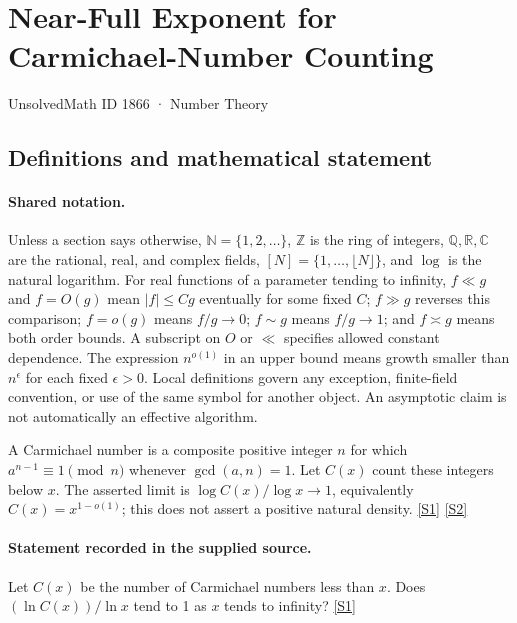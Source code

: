 \documentclass[11pt,a4paper]{article}
\newcommand{\N}{\mathbb{N}}
\newcommand{\Z}{\mathbb{Z}}
\newcommand{\Q}{\mathbb{Q}}
\newcommand{\R}{\mathbb{R}}
\newcommand{\C}{\mathbb{C}}
\newcommand{\sref}[2]{\hyperlink{source:#1:#2}{[S#2]}}
\begin{document}

\setcounter{section}{1865}

\section{Near-Full Exponent for Carmichael-Number Counting}\label{1866}

{\small\sffamily UnsolvedMath ID 1866 · Number Theory}

\subsection{Definitions and mathematical statement}

\paragraph{Shared notation.}Unless a section says otherwise, $\N=\{1,2,\ldots\}$,
$\Z$ is the ring of integers, $\Q,\R,\C$ are the rational, real, and complex
fields, $[N]=\{1,\ldots,\lfloor N\rfloor\}$, and $\log$ is the natural
logarithm. For real functions of a parameter tending to infinity,
$f\ll g$ and $f=O(g)$ mean $|f|\leq Cg$ eventually for some fixed $C$;
$f\gg g$ reverses this comparison; $f=o(g)$ means $f/g\to0$;
$f\sim g$ means $f/g\to1$; and $f\asymp g$ means both order bounds.
A subscript on $O$ or $\ll$ specifies allowed constant dependence.
The expression $n^{o(1)}$ in an upper bound means growth smaller than
$n^\epsilon$ for each fixed $\epsilon>0$. Local definitions govern any
exception, finite-field convention, or use of the same symbol for another
object. An asymptotic claim is not automatically an effective algorithm.



A Carmichael number is a composite positive integer $n$ for which $a^{n-1}\equiv1\pmod n$ whenever $\gcd(a,n)=1$. Let $C(x)$ count these integers below $x$. The asserted limit is $\log C(x)/\log x\to1$, equivalently $C(x)=x^{1-o(1)}$; this does not assert a positive natural density. \sref{1866}{1} \sref{1866}{2}

\paragraph{Statement recorded in the supplied source.}
Let $C(x)$ be the number of Carmichael numbers less than $x$. Does $(\ln C(x))/\ln x$ tend to 1 as $x$ tends to infinity? \sref{1866}{1}
\end{document}
